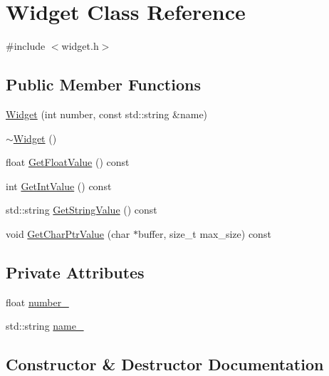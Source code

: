 \hypertarget{classWidget}{}\section{Widget Class Reference}
\label{classWidget}


{\ttfamily \#include $<$widget.\+h$>$}

\subsection*{Public Member Functions}
\begin{DoxyCompactItemize}
\item 
\hyperlink{classWidget_ab573b75a8a69d29c298af2485fb9cda9}{Widget} (int number, const std\+::string \&name)
\item 
\hyperlink{classWidget_aa24f66bcbaaec6d458b0980e8c8eae65}{$\sim$\+Widget} ()
\item 
float \hyperlink{classWidget_abf639d975e02cabda8132873aca1a333}{Get\+Float\+Value} () const
\item 
int \hyperlink{classWidget_a15e7d0423020a7a98063a749fb97bdd3}{Get\+Int\+Value} () const
\item 
std\+::string \hyperlink{classWidget_a7a6e3a7fca3a9373f631c94dc1494d22}{Get\+String\+Value} () const
\item 
void \hyperlink{classWidget_a50791a556979f22f5593383143c7f815}{Get\+Char\+Ptr\+Value} (char $\ast$buffer, size\+\_\+t max\+\_\+size) const
\end{DoxyCompactItemize}
\subsection*{Private Attributes}
\begin{DoxyCompactItemize}
\item 
float \hyperlink{classWidget_a27a2b3fd66372d5731fa9a6bcaab755b}{number\+\_\+}
\item 
std\+::string \hyperlink{classWidget_a1d2f74810f3f912270a681e0671a7a55}{name\+\_\+}
\end{DoxyCompactItemize}


\subsection{Constructor \& Destructor Documentation}
\mbox{\label{classWidget_ab573b75a8a69d29c298af2485fb9cda9}} 
